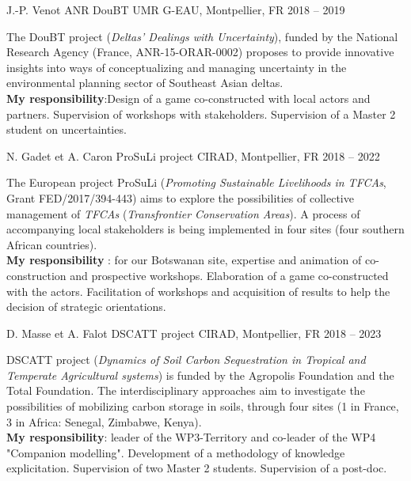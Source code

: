 \begin{cventries}
  \cventry
  {J.-P. Venot} %
  {ANR DouBT} %
  {UMR G-EAU, Montpellier, FR} %
  {2018 -- 2019} %
  {
    \begin{cvitems} %
      The DouBT project (\emph{Deltas' Dealings with Uncertainty}), funded by the National Research Agency (France, ANR-15-ORAR-0002) proposes to provide innovative insights into ways of conceptualizing and managing uncertainty in the environmental planning sector of Southeast Asian deltas.\\
      \textbf{My responsibility}:Design of a game co-constructed with local actors and partners.  Supervision of workshops with stakeholders. Supervision of a Master 2 student on uncertainties.
    \end{cvitems}
  }

  \cventry
  {N. Gadet et A. Caron} %
  {ProSuLi project} %
  {CIRAD, Montpellier, FR} %
  {2018 -- 2022} %
  {
    \begin{cvitems} %
      The European project ProSuLi (\emph{Promoting Sustainable Livelihoods in TFCAs}, Grant FED/2017/394-443) aims to explore the possibilities of collective management of \emph{TFCAs} (\emph{Transfrontier Conservation Areas}). A process of accompanying local stakeholders is being implemented in four sites (four southern African countries).\\
      \textbf{My responsibility} : for our Botswanan site, expertise and animation  of co-construction and prospective workshops. Elaboration of a game co-constructed with the actors. Facilitation of workshops and acquisition of results to help the decision of strategic orientations.
    \end{cvitems}
  }

  \cventry
  {D. Masse et A. Falot} %
  {DSCATT project} %
  {CIRAD, Montpellier, FR} %
  {2018 -- 2023} %
  {
    \begin{cvitems} %
        DSCATT project (\emph{Dynamics of Soil Carbon Sequestration in Tropical and Temperate Agricultural systems}) is funded by the Agropolis Foundation and the Total Foundation. The interdisciplinary approaches aim to investigate the possibilities of mobilizing carbon storage in soils, through four sites (1 in France, 3 in Africa: Senegal, Zimbabwe, Kenya).\\
        \textbf{My responsibility}: leader of the WP3-Territory and co-leader of the WP4 "Companion modelling". Development of a methodology of knowledge explicitation. Supervision of two Master 2 students. Supervision of a post-doc.
    \end{cvitems}
  }


\end{cventries}

